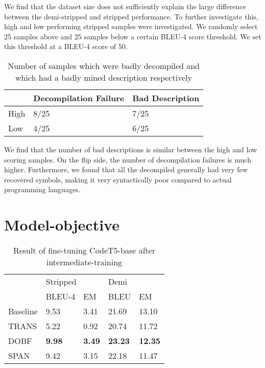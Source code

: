 We find that the dataset size does not sufficiently explain the large difference between the demi-stripped and stripped performance. To further investigate this, high and low performing stripped samples were investigated. We randomly select 25 samples above and 25 samples below a certain BLEU-4 score threshold. We set this threshold at a BLEU-4 score of 50.

\label{tab:manual}
\begin{table}[!h]
\centering
\begin{tabular}{lll}
\hline
\rowcolor[HTML]{C0C0C0} 
\multicolumn{1}{|l}{\cellcolor[HTML]{C0C0C0}\textbf{}} & Decompilation Failure & \multicolumn{1}{l|}{\cellcolor[HTML]{C0C0C0}Bad Description} \\ \hline
High                                                   & 8/25                     & 7/25                                                            \\
Low                                                    & 4/25                     & 6/25                                                           
\end{tabular}
\caption{Number of samples which were badly decompiled and which had a badly mined description respectively}
\end{table}

We find that the number of bad descriptions is similar between the high and low scoring samples. On the flip side, the number of decompilation failures is much higher.
Furthermore, we found that all the decompiled generally had very few recovered symbols, making it very syntactically poor compared to actual programming languages.


\section{Model-objective}

\label{tab:intermediate}
\begin{table}[!h]
\centering
\begin{tabular}{lll|ll}
\rowcolor[HTML]{C0C0C0} 
                               & \multicolumn{2}{l|}{\cellcolor[HTML]{C0C0C0}Stripped} & Demi           &       \\ \cline{2-5} 
\multicolumn{1}{l|}{\textbf{}} & BLEU-4                    & EM                        & BLEU           & EM    \\ \hline
\multicolumn{1}{l|}{Baseline}  & 9.53                      & 3.41                      & 21.69          & 13.10 \\
\multicolumn{1}{l|}{TRANS}     & 5.22                      & 0.92                      & 20.74          & 11.72 \\
\multicolumn{1}{l|}{DOBF}      & \textbf{9.98}             & \textbf{3.49}             & \textbf{23.23} & \textbf{12.35}   \\
\multicolumn{1}{l|}{SPAN}      & 9.42                      & 3.15                      & 22.18          & 11.47
\end{tabular}
\caption{Result of fine-tuning CodeT5-base after intermediate-training}
\end{table}

